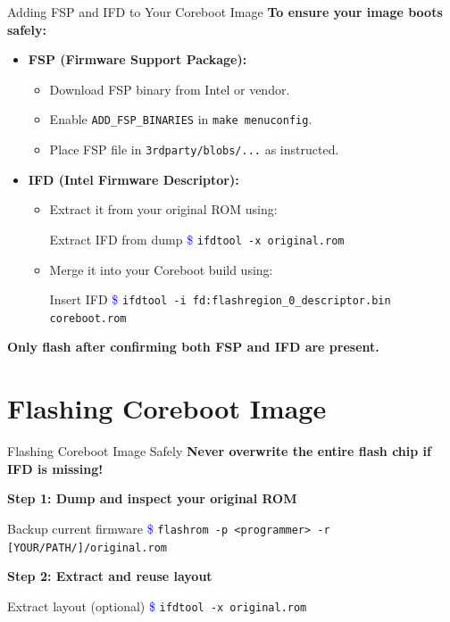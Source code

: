 \documentclass{beamer}
\begin{document}
	\begin{frame}{Adding FSP and IFD to Your Coreboot Image}
		\textbf{To ensure your image boots safely:}
		
		\begin{itemize}
			\item \textbf{FSP (Firmware Support Package):}
			\begin{itemize}
				\item Download FSP binary from Intel or vendor.
				\item Enable \texttt{ADD\_FSP\_BINARIES} in \texttt{make menuconfig}.
				\item Place FSP file in \texttt{3rdparty/blobs/...} as instructed.
			\end{itemize}
			
			\item \textbf{IFD (Intel Firmware Descriptor):}
			\begin{itemize}
				\item Extract it from your original ROM using:
				\begin{exampleblock}{Extract IFD from dump}
					\textcolor{blue}{\$} \texttt{ifdtool -x original.rom}
				\end{exampleblock}
				\item Merge it into your Coreboot build using:
				\begin{exampleblock}{Insert IFD}
					\textcolor{blue}{\$} \texttt{ifdtool -i fd:flashregion\_0\_descriptor.bin coreboot.rom}
				\end{exampleblock}
			\end{itemize}
		\end{itemize}
		
		\textbf{Only flash after confirming both FSP and IFD are present.}
	\end{frame}
	
	
	
	
	\section{Flashing Coreboot Image}
	\begin{frame}{Flashing Coreboot Image Safely}
		\textbf{Never overwrite the entire flash chip if IFD is missing!}
		
		\textbf{Step 1: Dump and inspect your original ROM}
		\begin{exampleblock}{Backup current firmware}
			\textcolor{blue}{\$} \texttt{flashrom -p <programmer> -r [YOUR/PATH/]/original.rom}
		\end{exampleblock}
		\vspace*{2.8em}
		\textbf{Step 2: Extract and reuse layout}
		\begin{exampleblock}{Extract layout (optional)}
			\textcolor{blue}{\$} \texttt{ifdtool -x original.rom}
		\end{exampleblock}
	\end{frame}
	
\end{document}

